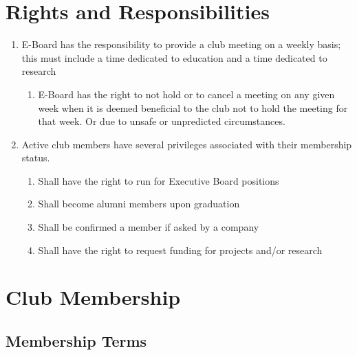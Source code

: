 \documentclass{article}
\begin{document}

\section{Rights and Responsibilities}

\begin{enumerate}
  \item E-Board has the responsibility to provide a club meeting on a weekly
    basis; this must include a time dedicated to education and a time dedicated
    to research
  \begin{enumerate}
    \item E-Board has the right to not hold or to cancel a meeting on any given
      week when it is deemed beneficial to the club not to hold the meeting for
      that week. Or due to unsafe or unpredicted circumstances.
  \end{enumerate}
  \item Active club members have several privileges associated with their
    membership status.
  \begin{enumerate}
    \item Shall have the right to run for Executive Board positions
    \item Shall become alumni members upon graduation
    \item Shall be confirmed a member if asked by a company
    \item Shall have the right to request funding for projects and/or research
  \end{enumerate}
\end{enumerate}


\section{Club Membership}

\subsection{Membership Terms}
\end{document}

